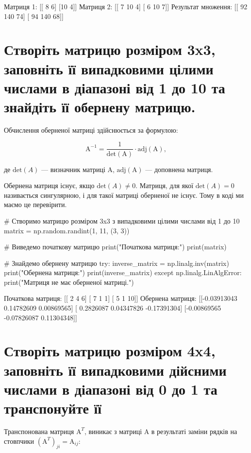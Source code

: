 \documentclass[]{article}
\newcounter{pythoncode}
\begin{document}
\begin{out}
	Матриця 1:
	[[ 8  6]
	 [10  4]]
	Матриця 2:
	[[ 7 10  4]
	 [ 6 10  7]]
	Результат множення:
	[[ 92 140  74]
	 [ 94 140  68]]
\end{out}

\section{Створіть матрицю розміром 3x3, заповніть її випадковими цілими числами в діапазоні від 1 до 10 та знайдіть її обернену матрицю.}

Обчислення оберненої матриці здійснюється за формулою:

\[ \mathrm{A}^{-1} = \frac{1}{\mathrm{det}(\mathrm{A})} \cdot \mathrm{adj}(\mathrm{A}), \]

де $ \mathrm{det}(A) $ --- визначник матриці \(\mathrm A\),
\(\mathrm{adj}(\mathrm{A})\) --- доповнена матриця.

Обернена матриця існує, якщо $ \mathrm{det}(A) \neq 0$. Матриця, для
якої $ \mathrm{det}(A) = 0$ називається сингулярною, і для такої
матриці оберненої не існує. Тому в коді ми маємо це перевірити.

\begin{pythoncode}
    # Створимо матрицю розміром 3x3 з випадковими цілими числами від 1 до 10
    matrix = np.random.randint(1, 11, (3, 3))

    # Виведемо початкову матрицю
    print("Початкова матриця:")
    print(matrix)

    # Знайдемо обернену матрицю
    try:
        inverse_matrix = np.linalg.inv(matrix)
        print("Обернена матриця:")
        print(inverse_matrix)
    except np.linalg.LinAlgError:
        print("Матриця не має оберненої матриці.")
\end{pythoncode}

\begin{out}
	Початкова матриця:
	[[ 2  4  6]
	 [ 7  1  1]
	 [ 5  1 10]]
	Обернена матриця:
	[[-0.03913043  0.14782609  0.00869565]
	 [ 0.2826087   0.04347826 -0.17391304]
	 [-0.00869565 -0.07826087  0.11304348]]
\end{out}

\section{Створіть матрицю розміром 4x4, заповніть її випадковими дійсними числами в діапазоні від 0 до 1 та транспонуйте її}

Транспонована матриця \(\mathrm{A}^T\), виникає з матриці \(\mathrm{A}\)
в результаті заміни рядків на стовпчики $(\mathrm{A}^{T})_{ji} =
	\mathrm{A}_{ij} $:
\end{document}
